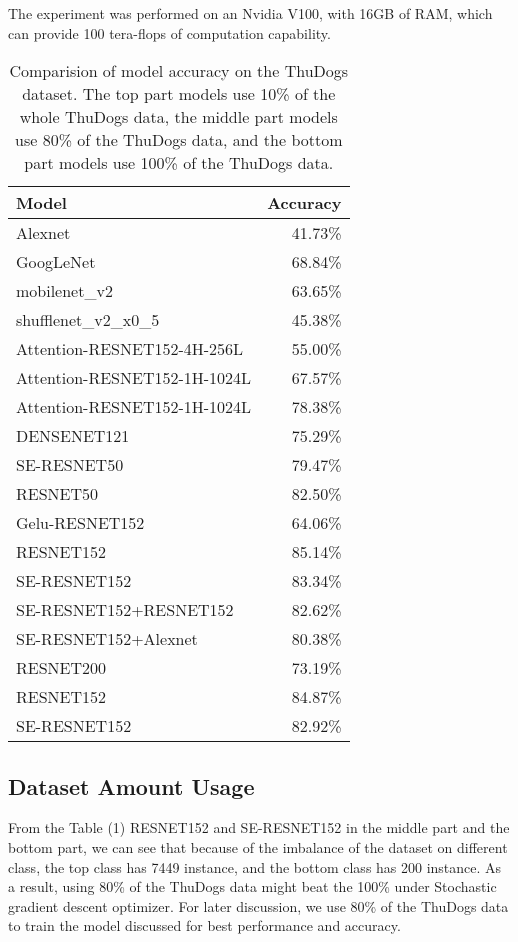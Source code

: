 \documentclass[runningheads]{llncs}
\begin{document}
\par The experiment was performed on an Nvidia V100, with 16GB of RAM,
which can provide 100 tera-flops of computation capability.

\begin{table}
\begin{center}
\begin{tabular}{|l|r|}
\hline
Model   &  Accuracy \\
\hline
\hline
Alexnet & 41.73\%\\
GoogLeNet & 68.84\%\\
mobilenet\_v2 & 63.65\%\\
shufflenet\_v2\_x0\_5  &	45.38\% \\
Attention-RESNET152-4H-256L &  	55.00\% \\
Attention-RESNET152-1H-1024L &  	67.57\% \\
\hline
\hline
\hline
Attention-RESNET152-1H-1024L &  	78.38\% \\
DENSENET121   	&	75.29\% \\
SE-RESNET50 & 79.47\% \\
RESNET50 & 82.50\%\\
Gelu-RESNET152 &	64.06\% \\
RESNET152  	&	85.14\% \\
SE-RESNET152  	&	83.34\% \\
SE-RESNET152+RESNET152 & 82.62\% \\
SE-RESNET152+Alexnet & 80.38\% \\
RESNET200  	&	73.19\% \\
\hline
\hline
\hline
RESNET152  	&	84.87\% \\
SE-RESNET152  	&	82.92\% \\
\hline
\end{tabular}
\end{center}
\caption{Comparision of model accuracy on the ThuDogs dataset. The top part models use 10\% of the whole ThuDogs data, the middle part models use 80\% of the ThuDogs data,
and the bottom part models use 100\% of the ThuDogs data.}
\end{table}

\subsection{Dataset Amount Usage}
From the Table (1) RESNET152 and SE-RESNET152 in the middle part and the bottom part, we can see that because of the imbalance of the dataset on different class, the top class has 7449 instance,
and the bottom class has 200 instance. As a result, using 80\% of the ThuDogs data might beat the 100\% under Stochastic gradient descent optimizer.
For later discussion, we use 80\% of the ThuDogs data to train the model discussed for best performance and accuracy.
\end{document}
